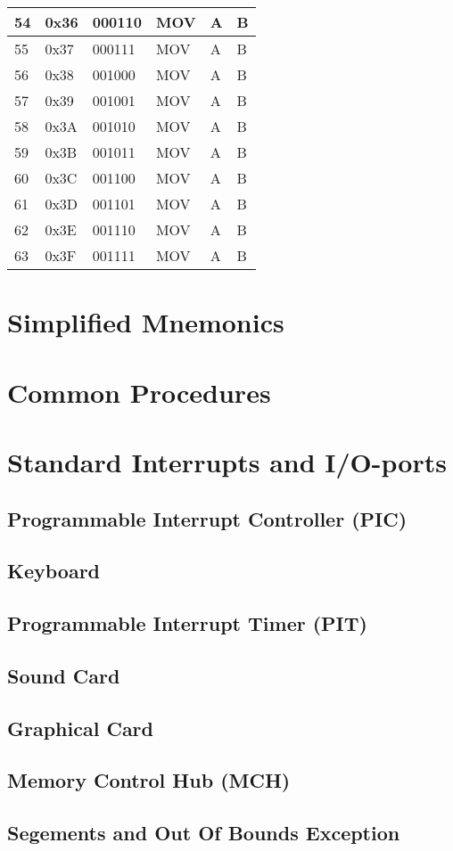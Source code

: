 \documentclass[twoside,a4paper]{memoir}
\begin{document}
\begin{table}[]
\begin{tabular}{|l|l|l|l|l|l|}
54 & 0x36 & 000110 & MOV  & A & B \\ \hline
55 & 0x37 & 000111 & MOV  & A & B \\ \hline
56 & 0x38 & 001000 & MOV  & A & B \\ \hline
57 & 0x39 & 001001 & MOV  & A & B \\ \hline
58 & 0x3A & 001010 & MOV  & A & B \\ \hline
59 & 0x3B & 001011 & MOV  & A & B \\ \hline
60 & 0x3C & 001100 & MOV  & A & B \\ \hline
61 & 0x3D & 001101 & MOV  & A & B \\ \hline
62 & 0x3E & 001110 & MOV  & A & B \\ \hline
63 & 0x3F & 001111 & MOV  & A & B \\ \hline
\end{tabular}
\end{table}

\chapter{Simplified Mnemonics}

\chapter{Common Procedures}

\chapter{Standard Interrupts and I/O-ports}
\section{Programmable Interrupt Controller (PIC)}
\section{Keyboard}
\section{Programmable Interrupt Timer (PIT)}
\section{Sound Card}
\section{Graphical Card}
\section{Memory Control Hub (MCH)}
\section{Segements and Out Of Bounds Exception}
\end{document}
